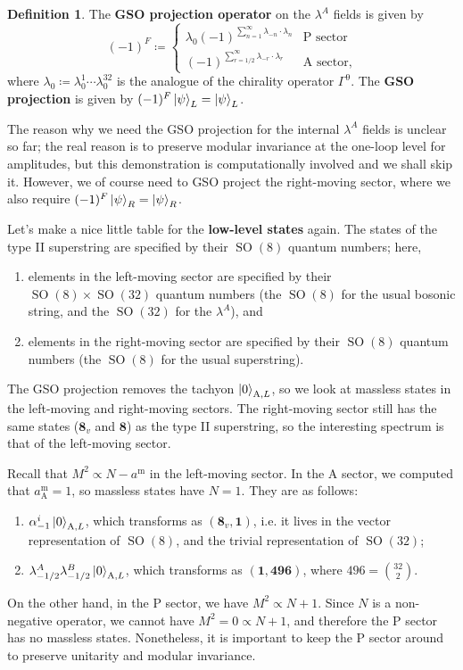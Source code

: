 \documentclass{report}
\theoremstyle{plain}
\theoremstyle{definition}
\newtheorem{definition}[theorem]{Definition}
\theoremstyle{remark}
\DeclareMathOperator{\SO}{SO}
\newcommand{\rep}[1]{\mathbf{#1}}
\begin{document}
\begin{definition}
  The {\bf GSO projection operator} on the $\lambda^A$ fields is given
  by
  \[ (-1)^F \coloneqq \begin{cases} \lambda_0 (-1)^{\sum_{n=1}^\infty \lambda_{-n} \cdot \lambda_n} & \text{P sector} \\ (-1)^{\sum_{r=1/2}^\infty \lambda_{-r} \cdot \lambda_r} & \text{A sector}, \end{cases} \]
  where $\lambda_0 \coloneqq \lambda_0^1 \cdots \lambda_0^{32}$ is the
  analogue of the chirality operator $\Gamma^9$. The {\bf GSO
    projection} is given by $(-1)^F \ket{\psi}_L = \ket{\psi}_L$.
\end{definition}

The reason why we need the GSO projection for the internal $\lambda^A$
fields is unclear so far; the real reason is to preserve modular
invariance at the one-loop level for amplitudes, but this
demonstration is computationally involved and we shall skip it.
However, we of course need to GSO project the right-moving sector,
where we also require $(-1)^F \ket{\psi}_R = \ket{\psi}_R$.

Let's make a nice little table for the {\bf low-level states} again.
The states of the type II superstring are specified by their $\SO(8)$
quantum numbers; here,
\begin{enumerate}
\item elements in the left-moving sector are specified by their
  $\SO(8) \times \SO(32)$ quantum numbers (the $\SO(8)$ for the usual
  bosonic string, and the $\SO(32)$ for the $\lambda^A$), and
\item elements in the right-moving sector are specified by their
  $\SO(8)$ quantum numbers (the $\SO(8)$ for the usual superstring).
\end{enumerate}
The GSO projection removes the tachyon $\ket{0}_{\text{A},L}$, so we
look at massless states in the left-moving and right-moving sectors.
The right-moving sector still has the same states ($\rep{8}_v$ and
$\rep{8}$) as the type II superstring, so the interesting spectrum is
that of the left-moving sector.

Recall that $M^2 \propto N - a^{\text{m}}$ in the left-moving sector.
In the A sector, we computed that $a^{\text{m}}_{\text{A}} = 1$, so
massless states have $N = 1$. They are as follows:
\begin{enumerate}
\item $\alpha_{-1}^i \ket{0}_{\text{A},L}$, which transforms as
  $(\rep{8}_v, \rep{1})$, i.e. it lives in the vector representation
  of $\SO(8)$, and the trivial representation of $\SO(32)$;
\item $\lambda^A_{-1/2} \lambda^B_{-1/2} \ket{0}_{\text{A},L}$, which
  transforms as $(\rep{1}, \rep{496})$, where $496 = \binom{32}{2}$.
\end{enumerate}
On the other hand, in the P sector, we have $M^2 \propto N + 1$. Since
$N$ is a non-negative operator, we cannot have $M^2 = 0 \propto N +
1$, and therefore the P sector has no massless states. Nonetheless, it
is important to keep the P sector around to preserve unitarity and
modular invariance.
\end{document}
